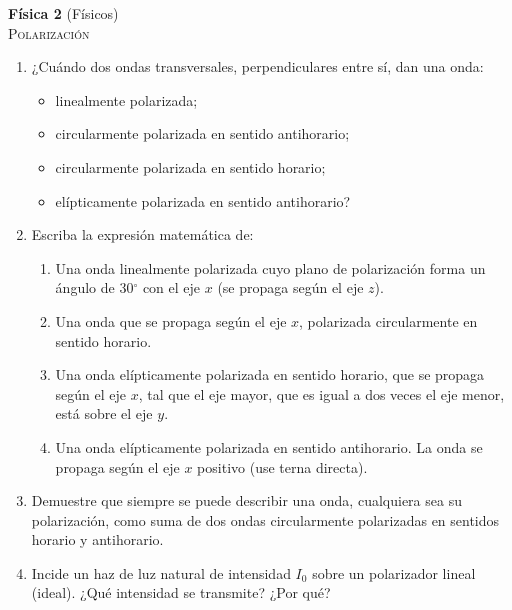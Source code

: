 \documentclass[11pt,spanish,a4paper]{article}
\begin{document}
\begin{center}
  \textbf{Física 2} (Físicos) \hfill {}\\
  \textsc{\LARGE Polarización}
\par\end{center}{\large \par}


\begin{enumerate}
\section*{Descripción geométrica}

\item ¿Cuándo dos ondas transversales, perpendiculares entre sí, dan una
onda:
\begin{itemize}
\item linealmente polarizada;
\item circularmente polarizada en sentido antihorario;
\item circularmente polarizada en sentido horario;
\item elípticamente polarizada en sentido antihorario? 
\end{itemize}


\item Escriba la expresión matemática de:
\begin{enumerate}
\item Una onda linealmente polarizada cuyo plano de polarización forma un
ángulo de 30$^{\circ}$ con el eje $x$ (se propaga según el eje $z$). 
\item Una onda que se propaga según el eje $x$, polarizada circularmente
en sentido horario.
\item Una onda elípticamente polarizada en sentido horario, que se propaga
según el eje $x$, tal que el eje mayor, que es igual a dos veces
el eje menor, está sobre el eje $y$.
\item Una onda elípticamente polarizada en sentido antihorario. La onda
se propaga según el eje $x$ positivo (use terna directa). 
\end{enumerate}



\item Demuestre que siempre se puede describir una onda, cualquiera sea
su polarización, como suma de dos ondas circularmente polarizadas
en sentidos horario y antihorario.


\item Incide un haz de luz natural de intensidad $I_{0}$ sobre un polarizador
lineal (ideal). ¿Qué intensidad se transmite? ¿Por qué?



\end{enumerate}
\end{document}
